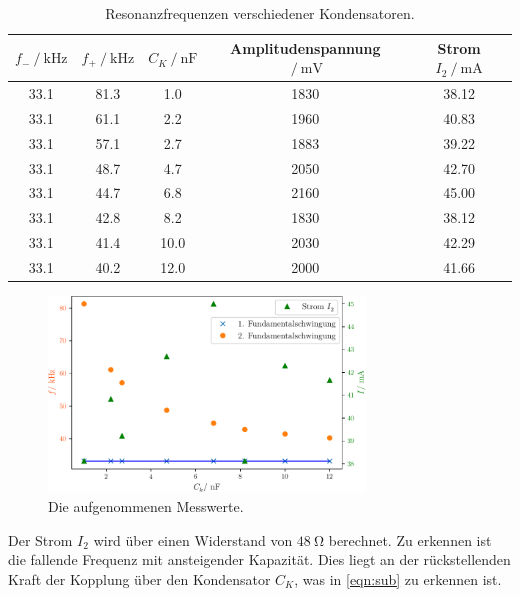 \begin{table}
    \centering
    \caption{Resonanzfrequenzen verschiedener Kondensatoren.}
    \label{tab:resonanz}
    \begin{tabular}{c c c c c}
        \toprule
        $f_- \:/\: \si{\kilo\hertz}$ & $f_+ \:/\: \si{\kilo\hertz}$ & $C_K \:/\: \si{\nano\farad}$ & Amplitudenspannung $\:/\: \si{\milli\volt}$ & Strom $I_2 \:/\: \si{\milli\ampere}$ \\
        \midrule
        33.1 & 81.3 & 1.0  & 1830  &  38.12  \\
        33.1 & 61.1 & 2.2  & 1960  &  40.83  \\
        33.1 & 57.1 & 2.7  & 1883  &  39.22  \\
        33.1 & 48.7 & 4.7  & 2050  &  42.70  \\
        33.1 & 44.7 & 6.8  & 2160  &  45.00  \\
        33.1 & 42.8 & 8.2  & 1830  &  38.12  \\
        33.1 & 41.4 & 10.0 & 2030  &  42.29  \\
        33.1 & 40.2 & 12.0 & 2000  &  41.66  \\
        \bottomrule
    \end{tabular}
\end{table}

\begin{figure}
    \centering
    \includegraphics[width=0.75\textwidth]{plots/Messdaten.pdf}
    \caption{Die aufgenommenen Messwerte.}
    \label{fig:messwerte}
\end{figure}

Der Strom $I_2$ wird über einen Widerstand von $\SI{48}{\ohm}$ berechnet.
Zu erkennen ist die fallende Frequenz mit ansteigender Kapazität. Dies liegt an der rückstellenden Kraft der Kopplung über den Kondensator $C_K$, was in \eqref{eqn:sub} zu erkennen ist.

